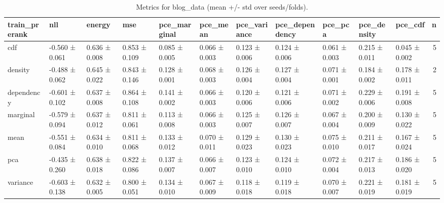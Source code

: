 \begin{table}
\caption{Metrics for blog_data (mean +/- std over seeds/folds).}
\label{tab:metrics_summary_blog_data}
\begin{tabular}{lllllllllllr}
\toprule
train_prerank & nll & energy & mse & pce_marginal & pce_mean & pce_variance & pce_dependency & pce_pca & pce_density & pce_cdf & n \\
\midrule
cdf & -0.560 ± 0.061 & 0.636 ± 0.008 & 0.853 ± 0.109 & 0.085 ± 0.005 & 0.066 ± 0.003 & 0.123 ± 0.006 & 0.124 ± 0.006 & 0.061 ± 0.003 & 0.215 ± 0.011 & 0.045 ± 0.002 & 5 \\
density & -0.488 ± 0.062 & 0.645 ± 0.022 & 0.843 ± 0.146 & 0.128 ± 0.001 & 0.068 ± 0.003 & 0.126 ± 0.004 & 0.127 ± 0.004 & 0.071 ± 0.001 & 0.184 ± 0.002 & 0.178 ± 0.011 & 2 \\
dependency & -0.601 ± 0.102 & 0.637 ± 0.008 & 0.864 ± 0.108 & 0.141 ± 0.002 & 0.066 ± 0.003 & 0.120 ± 0.006 & 0.121 ± 0.006 & 0.071 ± 0.002 & 0.229 ± 0.006 & 0.191 ± 0.008 & 5 \\
marginal & -0.579 ± 0.094 & 0.637 ± 0.012 & 0.811 ± 0.061 & 0.113 ± 0.008 & 0.066 ± 0.003 & 0.125 ± 0.007 & 0.126 ± 0.007 & 0.067 ± 0.004 & 0.200 ± 0.009 & 0.130 ± 0.022 & 5 \\
mean & -0.551 ± 0.084 & 0.634 ± 0.010 & 0.811 ± 0.068 & 0.133 ± 0.012 & 0.070 ± 0.011 & 0.129 ± 0.023 & 0.130 ± 0.023 & 0.075 ± 0.010 & 0.211 ± 0.017 & 0.167 ± 0.024 & 5 \\
pca & -0.435 ± 0.260 & 0.638 ± 0.018 & 0.822 ± 0.086 & 0.137 ± 0.007 & 0.066 ± 0.007 & 0.123 ± 0.010 & 0.124 ± 0.010 & 0.072 ± 0.004 & 0.217 ± 0.013 & 0.186 ± 0.020 & 5 \\
variance & -0.603 ± 0.138 & 0.632 ± 0.005 & 0.800 ± 0.051 & 0.134 ± 0.010 & 0.067 ± 0.009 & 0.118 ± 0.018 & 0.119 ± 0.018 & 0.070 ± 0.007 & 0.221 ± 0.019 & 0.181 ± 0.019 & 5 \\
\bottomrule
\end{tabular}
\end{table}
